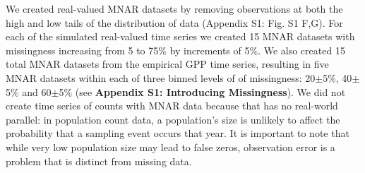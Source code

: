 \documentclass[12pt,english]{article} %
\begin{document}
\begin{linenumbers}
\begin{spacing}{1.9}
\begin{flushleft}
\hspace{1em} We created real-valued MNAR datasets by removing observations at both the high and low tails of the distribution of data (Appendix S1: Fig. S1 F,G). %
For each of the simulated real-valued time series we created 15 MNAR datasets with missingness increasing from 5 to 75\% by increments of 5\%. We also created 15 total MNAR datasets from the empirical GPP time series, resulting in five MNAR datasets within each of three binned levels of of missingness: 20$\pm$5\%, 40$\pm$5\% and 60$\pm$5\% (see \textbf{Appendix S1: Introducing Missingness}). We did not create time series of counts with MNAR data because that has no real-world parallel: in population count data, a population's size is unlikely to affect the probability that a sampling event occurs that year. It is important to note that while very low population size may lead to false zeros, observation error is a problem that is distinct from missing data. %



\end{flushleft}
\end{spacing}
\end{linenumbers}
\end{document}
